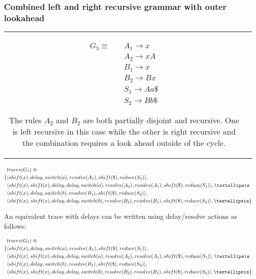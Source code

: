 \documentclass[a4paper,11pt]{article}
\begin{document}
\subsubsection{Combined left and right recursive grammar with outer lookahead}
\begin{tabular}[t]{cl}
\parbox{.3\textwidth}{
\begin{align*}
G_5 \equiv \quad & A_1 \rightarrow x\\
                 & A_2 \rightarrow x A\\
                 & B_1 \rightarrow x\\
                 & B_2 \rightarrow B x\\
                 & S_1 \rightarrow A a \$\\
                 & S_2 \rightarrow B b \$
\end{align*}}
\parbox{.8\textwidth}{The rules $A_2$ and $B_2$ are both partially disjoint and recursive. One is left recursive in this case while the other is right recursive and the combination
requires a look ahead outside of the cycle.}
\end{tabular}

\parbox{.3\textwidth}{\begin{align*}
&traces(G_5) \equiv \\
\{ & \langle shift(x), delay, switch(a), resolve(A_1), shift(\$), reduce(S_1) \rangle,\\
   & \langle shift(x), shift(x), delay, delay, switch(a), resolve(A_2), resolve(A_1), shift(\$), reduce(S_1) \rangle, \textellipsis \\
   & \langle shift(x), delay, switch(b), resolve(B_1), shift(\$), reduce(S_2) \rangle,\\
   & \langle shift(x), shift(x), delay, delay, switch(b), resolve(B_2), resolve(B_1), shift(\$), reduce(S_2) \rangle, \textellipsis \}
\end{align*}}

An equivalent trace with delays can be written using delay/resolve actions as follows:

\parbox{.3\textwidth}{\begin{align*}
&traces(G_5) \equiv \\
\{ & \langle shift(x), delay, switch(a), resolve(A_1), shift(\$), reduce(S_1) \rangle,\\
   & \langle shift(x), shift(x), delay, delay, switch(a), resolve(A_2), resolve(A_1), shift(\$), reduce(S_1) \rangle, \textellipsis \\
   & \langle shift(x), delay, switch(b), resolve(B_1), shift(\$), reduce(S_2) \rangle,\\
   & \langle shift(x), shift(x), delay, delay, switch(b), resolve(B_2), resolve(B_1), shift(\$), reduce(S_2) \rangle, \textellipsis \}
\end{align*}}
\end{document}
